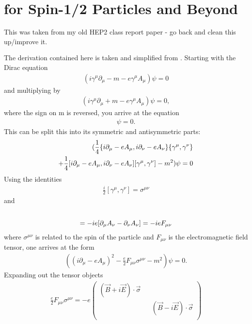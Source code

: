 
\thispagestyle{myheadings}

\chapter{\g for Spin-1/2 Particles and Beyond}
\label{gDirac}

This was taken from my old HEP2 class report paper - go back and clean this up/improve it.

The derivation contained here is taken and simplified from . Starting with the Dirac equation 
\begin{align}
(i\gamma^{\mu}\partial_{\mu} - m -e \gamma^{\mu}A_{\mu})\psi = 0
\end{align}
and multiplying by 
\begin{align}
(i\gamma^{\mu}\partial_{\mu} + m -e \gamma^{\mu}A_{\mu})\psi = 0,
\end{align}
where the sign on m is reversed, you arrive at the equation
\begin{align}
[(i\partial_{\mu}-eA_{\mu})(i\partial_{\nu}-eA_{\nu})\gamma^{\mu}\gamma^{\nu} - m^{2}]\psi = 0.
\end{align}
This can be split this into its symmetric and antisymmetric parts:
\begin{align}
(\frac{1}{4}\{i\partial_{\mu}-eA_{\mu},i\partial_{\nu}-eA_{\nu}\}\{\gamma^{\mu}, \gamma^{\nu}\} \notag \\
+\frac{1}{4}[i\partial_{\mu}-eA_{\mu},i\partial_{\nu}-eA_{\nu}][\gamma^{\mu}, \gamma^{\nu}] - m^{2})\psi = 0
\end{align}
Using the identities 
\begin{align}
\frac{i}{2}[\gamma^{\mu}, \gamma^{\nu}] = \sigma^{\mu\nu}
\end{align}
and
\begin{align}
[i\partial_{\mu}-eA_{\mu},i\partial_{\nu}-eA_{\nu}] \notag \\
= -ie[\partial_{\mu}A_{\nu} - \partial_{\nu}A_{\nu}] = -ie F_{\mu\nu}
\end{align}
where $\sigma^{\mu\nu}$ is related to the spin of the particle and $F_{\mu\nu}$ is the electromagnetic field tensor, one arrives at the form
\begin{align}
((i\partial_{\mu}-eA_{\mu})^{2} - \frac{e}{2} F_{\mu\nu}\sigma^{\mu\nu} - m^{2})\psi = 0.
\end{align}
Expanding out the tensor objects
\begin{align}
\frac{e}{2} F_{\mu\nu}\sigma^{\mu\nu} = -e
\begin{pmatrix}
(\vec{B} + i \vec{E})\cdot \vec{\sigma} && \\
&& (\vec{B} - i \vec{E})\cdot \vec{\sigma} \\
\end{pmatrix}
\end{align}
